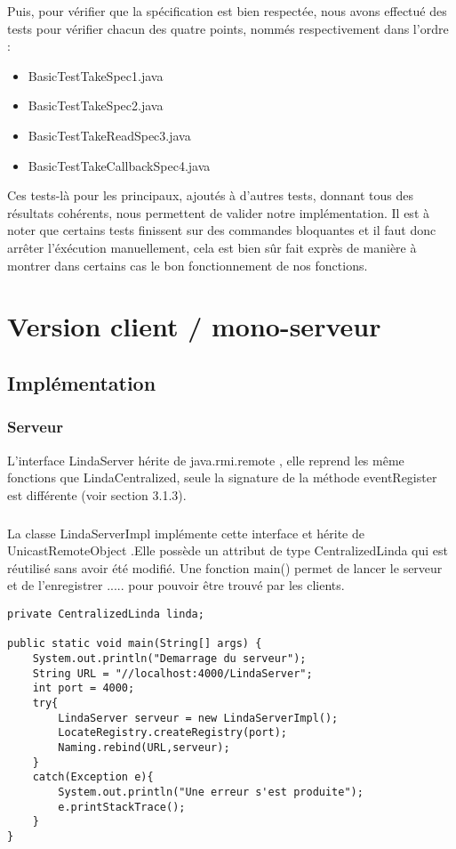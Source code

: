 \documentclass{report}
\begin{document}
Puis, pour vérifier que la spécification est bien respectée, nous avons effectué des tests pour vérifier chacun des quatre points, nommés respectivement dans l'ordre :
\begin{itemize}
\item BasicTestTakeSpec1.java
\item BasicTestTakeSpec2.java
\item BasicTestTakeReadSpec3.java
\item BasicTestTakeCallbackSpec4.java
\end{itemize}

Ces tests-là pour les principaux, ajoutés à d'autres tests, donnant tous des résultats cohérents, nous permettent de valider notre implémentation. Il est à noter que certains tests finissent
sur des commandes bloquantes et il faut donc arrêter l'éxécution manuellement, cela est bien sûr fait exprès de manière à montrer dans certains cas le bon fonctionnement de nos fonctions.

\chapter{Version client / mono-serveur}

\section{Implémentation}
\subsection{Serveur}
L'interface LindaServer hérite de java.rmi.remote , elle reprend les même fonctions que LindaCentralized, seule la signature de la méthode eventRegister est différente (voir section 3.1.3).
\paragraph{}La classe LindaServerImpl implémente cette interface et hérite de UnicastRemoteObject .Elle possède un attribut de type CentralizedLinda qui est réutilisé sans avoir été modifié.
Une fonction main() permet de lancer le serveur et de l'enregistrer ..... pour pouvoir être trouvé par les clients. 
\begin{lstlisting}
private CentralizedLinda linda;
	
public static void main(String[] args) {
	System.out.println("Demarrage du serveur");	
	String URL = "//localhost:4000/LindaServer";
	int port = 4000;
	try{
		LindaServer serveur = new LindaServerImpl();
		LocateRegistry.createRegistry(port);
		Naming.rebind(URL,serveur);
	}
	catch(Exception e){
		System.out.println("Une erreur s'est produite");
		e.printStackTrace();
	}	
}
\end{lstlisting}
\newpage
\end{document}
